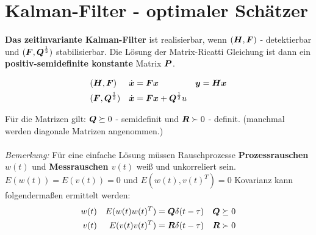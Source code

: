 \setcounter{section}{15}
\section{Kalman-Filter - optimaler Schätzer}
\begin{tcolorbox}[colback=white!10!white,colframe=green!30!black] 
    \textbf{Das zeitinvariante Kalman-Filter} ist realisierbar, wenn
    $(\boldsymbol{H},\boldsymbol{F})$ - detektierbar und $(\boldsymbol{F},\boldsymbol{Q}^{\frac{1}{2}})$ stabilisierbar. Die Lösung der Matrix-Ricatti Gleichung ist dann ein \textbf{positiv-semidefinite konstante} Matrix $\boldsymbol{P}$. 
    \begin{tcolorbox}[colback=white!10!white,colframe=green!30!black]
        \begin{align*}
        &    (\boldsymbol{H},\boldsymbol{F})& &\dot{\boldsymbol{x}} = \boldsymbol{Fx} & &\boldsymbol{y} = \boldsymbol{Hx}\\
        &    (\boldsymbol{F},\boldsymbol{Q}^{\frac{1}{2}})&& \dot{\boldsymbol{x}} = \boldsymbol{Fx}+\boldsymbol{Q}^{\frac{1}{2}}u & &
        \end{align*}
    \end{tcolorbox}
    
    Für die Matrizen gilt: $\boldsymbol{Q}\succeq0$ - semidefinit und $\boldsymbol{R}\succ0$ - definit. (manchmal werden diagonale Matrizen angenommen.)
    \\\\
    \textit{Bemerkung:} Für eine einfache Lösung müssen Rauschprozesse \textbf{Prozessrauschen $w(t)$} und \textbf{Messrauschen $v(t)$} weiß und unkorreliert sein. $E(w(t))= E(v(t)) =0$ und $E(w(t),v(t)^T)=0$
    Kovarianz kann folgendermaßen ermittelt werden:
        \begin{align*}
            w(t) & & E(w(t)w(t)^T) =\boldsymbol{Q}\delta(t-\tau) && \boldsymbol{Q} \succeq 0 \\ v(t) & & E(v(t)v(t)^T) = \boldsymbol{R}\delta(t-\tau) && \boldsymbol{R} \succ 0
         \end{align*}
    

\end{tcolorbox}
